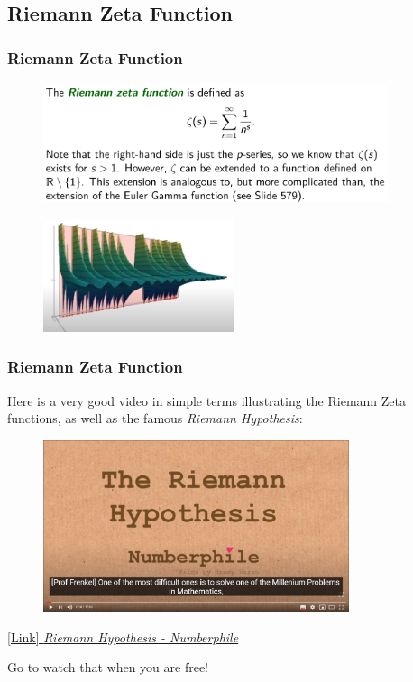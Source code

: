 \documentclass[10pt, t]{beamer}
\renewcommand{\emph}[1]{{\color{themecolor}\textsl{#1}}}
\begin{document}
\subsection{Riemann Zeta Function}
\begin{frame}
    \frametitle{Riemann Zeta Function}
    \begin{figure}[H]
        \centering
        \includegraphics[width=0.9\textwidth]{2020-12-02-14-29-10.png}
    \end{figure}

    \begin{figure}[H]
        \centering
        \includegraphics[width=0.5\textwidth]{2020-12-02-14-28-34.png}
    \end{figure}
\end{frame}
\begin{frame}
    \frametitle{Riemann Zeta Function}

    Here is a very good video in simple terms illustrating the Riemann Zeta functions, as well as the famous \emph{Riemann Hypothesis}:
    \begin{center}
        \begin{figure}[H]
            \centering
            \includegraphics[width=0.8\textwidth]{2020-12-02-14-48-15.png}
        \end{figure}
        \href{https://www.youtube.com/watch?v=d6c6uIyieoo}{[Link] \textit{Riemann Hypothesis - Numberphile}}
    \end{center}
    Go to watch that when you are free!

\end{frame}
\end{document}
